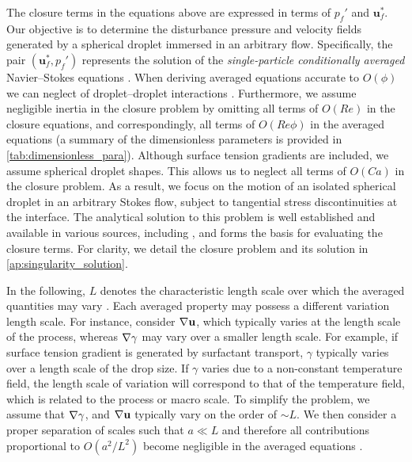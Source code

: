 The closure terms in the equations above are expressed in terms of $p_f'$ and $\textbf{u}_f^*$. 
Our objective is to determine the disturbance pressure and velocity fields generated by a spherical droplet immersed in an arbitrary flow. 
Specifically, the pair $(\textbf{u}_f^*, p_f')$ represents the solution of the \textit{single-particle conditionally averaged} Navier–Stokes equations \citep{hinch1977averaged, zhang1994averaged, fintzi2025}.
When deriving averaged equations accurate to $O(\phi)$ we can neglect of droplet–droplet interactions \citep{hinch1977averaged, zhang1994averaged}. 
Furthermore, we assume negligible inertia in the closure problem by omitting all terms of $O(Re)$ in the closure equations, and correspondingly, all terms of $O(Re\phi)$ in the averaged equations (a summary of the dimensionless parameters is provided in \ref{tab:dimensionless_para}).
Although surface tension gradients are included, we assume spherical droplet shapes. 
This allows us to neglect all terms of $O(Ca)$ in the closure problem. 
As a result, we focus on the motion of an isolated spherical droplet in an arbitrary Stokes flow, subject to tangential stress discontinuities at the interface.
The analytical solution to this problem is well established and available in various sources, including \citet{
Subramanian_1985,
nadim1991motion,
pozrikidis1992boundary,
leal2007advanced,
raja2010inertial,
pozrikidis2011introduction,
kim2013microhydrodynamics}, and forms the basis for evaluating the closure terms.
For clarity, we detail the closure problem and its solution in \ref{ap:singularity_solution}.


In the following, $L$ denotes the characteristic length scale over which the averaged quantities may vary \citep{jackson1997locally}. 
Each averaged property may possess a different variation length scale.
For instance, consider $\mathbf{\nabla} \textbf{u}$, which typically varies at the length scale of the process, whereas $\mathbf{\nabla}\gamma$ may vary over a smaller length scale. 
For example, if surface tension gradient is generated by surfactant transport, $\gamma$ typically varies over a length scale of the drop size. 
If $\gamma$ varies due to a non-constant temperature field, the length scale of variation will correspond to that of the temperature field, which is related to the process or macro scale. 
To simplify the problem, we assume that $\mathbf{\nabla}\gamma$, and $\mathbf{\nabla} \textbf{u}$ typically vary on the order of $\sim L$. 
We then consider a proper separation of scales such that $a\ll L$ and therefore all contributions proportional to  $O(a^2/L^2)$ become negligible in the averaged equations \citep{jackson1997locally,zhang1997momentum}. 


